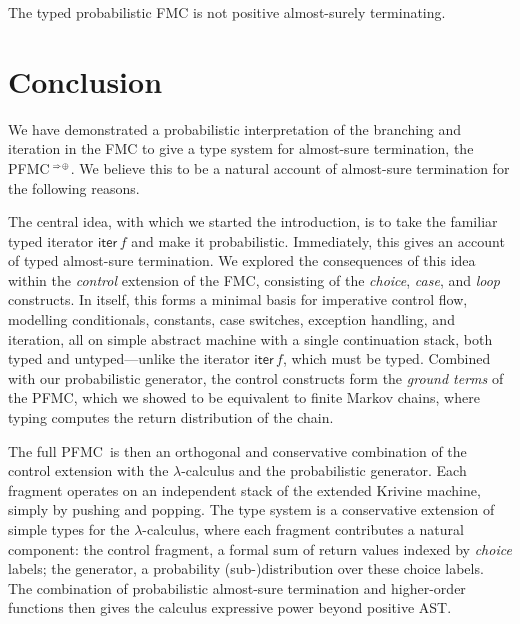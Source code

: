 \documentclass[a4paper,UKenglish,cleveref, autoref, thm-restate]{lipics-v2021}
\newcommand\PFMC{\textrm{PFMC}}
\newcommand\PFMCT{\PFMC$^{\,\smallbin{\Rightarrow\oplus}}$}
\begin{document}
\begin{proposition}
\label{prop:NAST}
The typed probabilistic FMC is not positive almost-surely terminating.
\end{proposition}


\section{Conclusion}

We have demonstrated a probabilistic interpretation of the branching and iteration in the FMC to give a type system for almost-sure termination, the \PFMCT. We believe this to be a natural account of almost-sure termination for the following reasons.

The central idea, with which we started the introduction, is to take the familiar typed iterator $\mathsf{iter}\,f$ and make it probabilistic. Immediately, this gives an account of typed almost-sure termination. We explored the consequences of this idea within the \emph{control} extension of the FMC, consisting of the \emph{choice}, \emph{case}, and \emph{loop} constructs. In itself, this forms a minimal basis for imperative control flow, modelling conditionals, constants, case switches, exception handling, and iteration, all on simple abstract machine with a single continuation stack, both typed and untyped---unlike the iterator $\mathsf{iter}\,f$, which must be typed. Combined with our probabilistic generator, the control constructs form the \emph{ground terms} of the \PFMC, which we showed to be equivalent to finite Markov chains, where typing computes the return distribution of the chain.

The full \PFMC\ is then an orthogonal and conservative combination of the control extension with the $\lambda$-calculus and the probabilistic generator. Each fragment operates on an independent stack of the extended Krivine machine, simply by pushing and popping. The type system is a conservative extension of simple types for the $\lambda$-calculus, where each fragment contributes a natural component: the control fragment, a formal sum of return values indexed by \emph{choice} labels; the generator, a probability (sub-)distribution over these choice labels. The combination of probabilistic almost-sure termination and higher-order functions then gives the calculus expressive power beyond positive AST.
\end{document}
